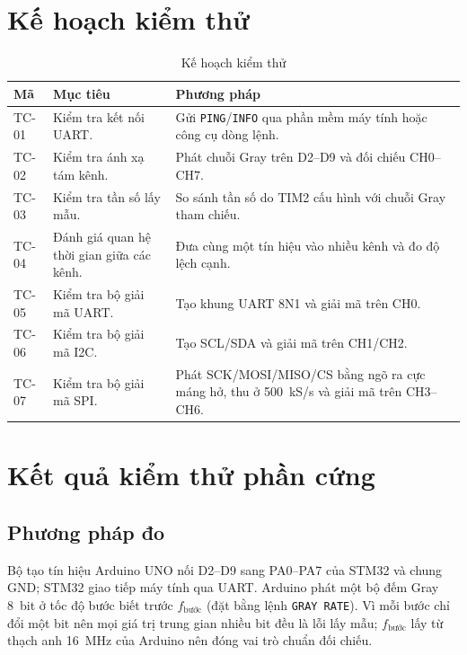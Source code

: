 \section{Kế hoạch kiểm thử}\label{sec:test-plan}

\begin{longtable}[]{@{}|
  >{\raggedright\arraybackslash}p{}
  |>{\raggedright\arraybackslash}p{}
  |>{\raggedright\arraybackslash}p{}|@{}}
\caption{Kế hoạch kiểm thử}\tabularnewline
\hline
\textbf{Mã} & \textbf{Mục tiêu} & \textbf{Phương pháp} \\ \hline

TC-01 & Kiểm tra kết nối UART. & Gửi \texttt{PING}/\texttt{INFO} qua phần mềm máy tính hoặc công cụ dòng lệnh. \\ \hline
TC-02 & Kiểm tra ánh xạ tám kênh. & Phát chuỗi Gray trên D2--D9 và đối chiếu CH0--CH7. \\ \hline
TC-03 & Kiểm tra tần số lấy mẫu. & So sánh tần số do TIM2 cấu hình với chuỗi Gray tham chiếu. \\ \hline
TC-04 & Đánh giá quan hệ thời gian giữa các kênh. & Đưa cùng một tín hiệu vào nhiều kênh và đo độ lệch cạnh. \\ \hline
TC-05 & Kiểm tra bộ giải mã UART. & Tạo khung UART 8N1 và giải mã trên CH0. \\ \hline
TC-06 & Kiểm tra bộ giải mã I2C. & Tạo SCL/SDA và giải mã trên CH1/CH2. \\ \hline
TC-07 & Kiểm tra bộ giải mã SPI. & Phát SCK/MOSI/MISO/CS bằng ngõ ra cực máng hở, thu ở 500~kS/s và giải mã trên CH3--CH6. \\ \hline

\end{longtable}

\clearpage
\section{Kết quả kiểm thử phần cứng}\label{sec:hil-results}

\subsection{Phương pháp đo}\label{sec:method}

Bộ tạo tín hiệu Arduino UNO nối D2--D9 sang PA0--PA7 của STM32 và chung GND; STM32 giao tiếp máy tính qua UART. Arduino phát một bộ đếm Gray 8~bit ở tốc độ bước biết trước \(f_{\text{bước}}\) (đặt bằng lệnh \texttt{GRAY RATE}). Vì mỗi bước chỉ đổi một bit nên mọi giá trị trung gian nhiều bit đều là lỗi lấy mẫu; \(f_{\text{bước}}\) lấy từ thạch anh 16~MHz của Arduino nên đóng vai trò chuẩn đối chiếu.

